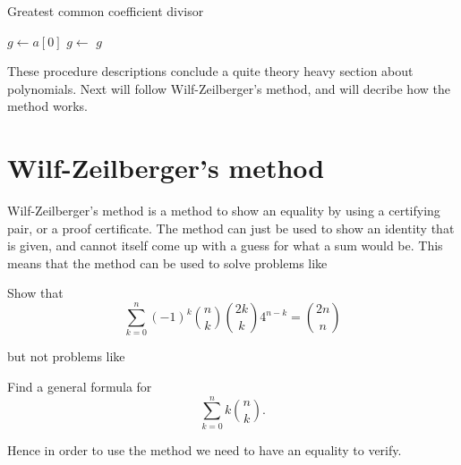\begin{algorithm}[H]
  \caption{Greatest common coefficient divisor}
  \begin{algorithmic}[1]
      \State $g\gets a[0]$
        \State $g\gets$ 
      \EndFor
      \State \Return $g$
    \EndProcedure
  \end{algorithmic}
\end{algorithm}
These procedure descriptions conclude a quite theory heavy section about polynomials. Next will follow Wilf-Zeilberger's method, and will decribe how the method works.

\section{Wilf-Zeilberger's method}
Wilf-Zeilberger's method is a method to show an equality by using a certifying pair, or a proof certificate. The method can just be used to show an identity that is given, and cannot itself come up with a guess for what a sum would be. This means that the method can be used to solve problems like
\begin{example}
  Show that $$\sum_{k=0}^n (-1)^k\binom{n}{k}\binom{2k}{k}4^{n-k}=\binom{2n}{n}$$
\end{example}
but not problems like
\begin{example}
  Find a general formula for $$\sum_{k=0}^n k\binom{n}{k}.$$
\end{example}
Hence in order to use the method we need to have an equality to verify.

